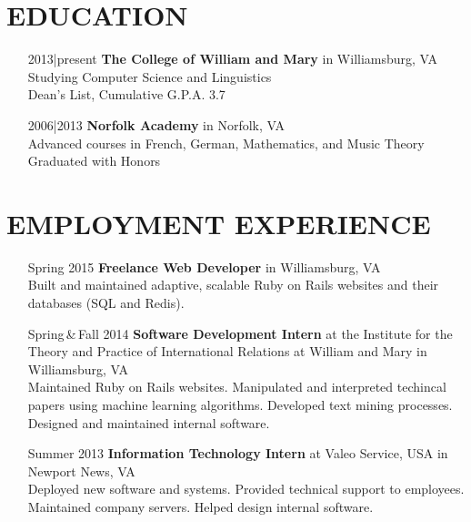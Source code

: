 \documentclass{res}     %
\begin{document}
\begin{resume}

\section{EDUCATION}          
\vspace{5mm}
\begin{itemize}[font=\itshape,align=parleft,labelwidth=3cm,leftmargin=2cm]
    \item[2013|present]
        \textbf{The College of William and Mary} in Williamsburg, VA
        \\ Studying Computer Science and Linguistics
        \\ Dean's List, Cumulative G.P.A. 3.7
    \item[2006|2013]
        \textbf{Norfolk Academy} in Norfolk, VA
        \\ Advanced courses in French, German, Mathematics, and Music Theory
        \\ Graduated with Honors
\end{itemize}

\section{EMPLOYMENT EXPERIENCE}
\vspace{5mm}
\begin{itemize}[font=\itshape,align=parleft,labelwidth=3cm,leftmargin=2cm]
    \item[Spring 2015]
        \textbf{Freelance Web Developer}
        in Williamsburg, VA
        \vspace{1mm} \\
        Built and maintained adaptive, scalable Ruby on Rails websites and their databases (SQL and Redis).
    \item[Spring\,\&\,Fall 2014]
        \textbf{Software Development Intern}
        at the Institute for the Theory and Practice of International Relations
        at William and Mary
        in Williamsburg, VA
        \vspace{1mm} \\
        Maintained Ruby on Rails websites.
        Manipulated and interpreted techincal papers using machine learning algorithms.
        Developed text mining processes.
        Designed and maintained internal software.
    \item[Summer 2013]
        \textbf{Information Technology Intern}
        at Valeo Service, USA
        in Newport News, VA
        \vspace{1mm} \\
        Deployed new software and systems.
        Provided technical support to employees.
        Maintained company servers.
        Helped design internal software.
\end{itemize}


\end{resume}
\end{document}
